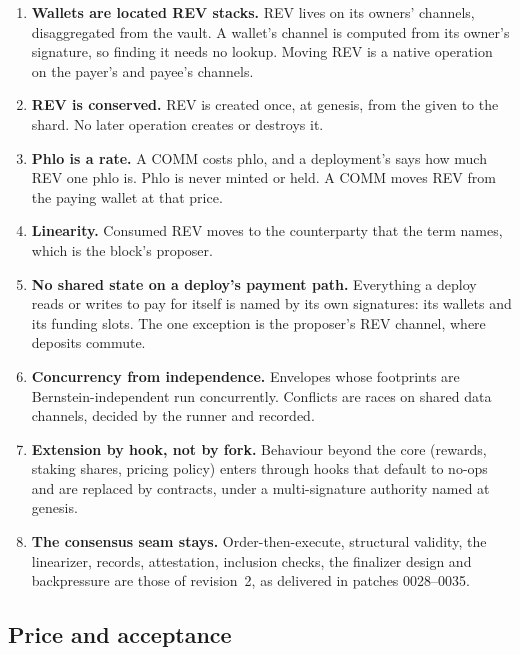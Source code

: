 \documentclass[11pt]{article}
\newcommand{\code}{\path}
\begin{document}
\begin{enumerate}[label=P\arabic*.,leftmargin=2.2em]
\item \textbf{Wallets are located REV stacks.} REV lives on its owners' channels, disaggregated from the vault. A wallet's channel is computed from its owner's signature, so finding it needs no lookup. Moving REV is a native operation on the payer's and payee's channels.
\item \textbf{REV is conserved.} REV is created once, at genesis, from the \code{wallets.txt} given to the shard. No later operation creates or destroys it.
\item \textbf{Phlo is a rate.} A COMM costs phlo, and a deployment's \code{phloPrice} says how much REV one phlo is. Phlo is never minted or held. A COMM moves REV from the paying wallet at that price.
\item \textbf{Linearity.} Consumed REV moves to the counterparty that the term names, which is the block's proposer.
\item \textbf{No shared state on a deploy's payment path.} Everything a deploy reads or writes to pay for itself is named by its own signatures: its wallets and its funding slots. The one exception is the proposer's REV channel, where deposits commute.
\item \textbf{Concurrency from independence.} Envelopes whose footprints are Bernstein-independent run concurrently. Conflicts are races on shared data channels, decided by the runner and recorded.
\item \textbf{Extension by hook, not by fork.} Behaviour beyond the core (rewards, staking shares, pricing policy) enters through hooks that default to no-ops and are replaced by contracts, under a multi-signature authority named at genesis.
\item \textbf{The consensus seam stays.} Order-then-execute, structural validity, the linearizer, records, attestation, inclusion checks, the finalizer design and backpressure are those of revision~2, as delivered in patches 0028--0035.
\end{enumerate}

\subsection{Price and acceptance}
\end{document}
